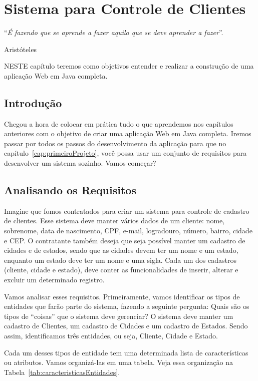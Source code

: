 \chapter{Sistema para Controle de Clientes}\label{cap:sistemaControleClientes}
\epigraph{``\textit{É fazendo que se aprende a fazer aquilo que se deve aprender a fazer}''.}{Aristóteles}

\lettrine[lines=4, lhang=0.1, lraise=0, loversize=0.2, findent=0.1em]{\textcolor{corTema}{N}}{ESTE} capítulo teremos como objetivos entender e realizar a construção de uma aplicação Web em Java completa.


\section{Introdução}

Chegou a hora de colocar em prática tudo o que aprendemos nos capítulos anteriores com o objetivo de criar uma aplicação Web em Java completa. Iremos passar por todos os passos do desenvolvimento da aplicação para que no capítulo~\ref{cap:primeiroProjeto}, você possa usar um conjunto de requisitos para desenvolver um sistema sozinho. Vamos começar?


\section{Analisando os Requisitos}

Imagine que fomos contratados para criar um sistema para controle de cadastro de clientes. Esse sistema deve manter vários dados de um cliente: nome, sobrenome, data de nascimento, CPF, e-mail, logradouro, número, bairro, cidade e CEP. O contratante também deseja que seja possível manter um cadastro de cidades e de estados, sendo que as cidades devem ter um nome e um estado, enquanto um estado deve ter um nome e uma sigla. Cada um dos cadastros (cliente, cidade e estado), deve conter as funcionalidades de inserir, alterar e excluir um determinado registro.

Vamos analisar esses requisitos. Primeiramente, vamos identificar os tipos de entidades que farão parte do sistema, fazendo a seguinte pergunta: Quais são os tipos de ``coisas'' que o sistema deve gerenciar? O sistema deve manter um cadastro de Clientes, um cadastro de Cidades e um cadastro de Estados. Sendo assim, identificamos três entidades, ou seja, Cliente, Cidade e Estado.

Cada um desses tipos de entidade tem uma determinada lista de características ou atributos. Vamos organizá-las em uma tabela. Veja essa organização na Tabela~\ref{tab:caracteristicasEntidades}.

